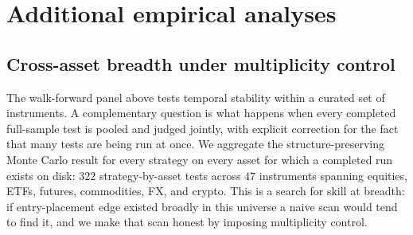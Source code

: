 \documentclass[preprint,12pt]{elsarticle}
\theoremstyle{definition}
\begin{document}
\section{Additional empirical analyses}
\label{supp:additional}

\subsection{Cross-asset breadth under multiplicity control}
\label{sec:supp-cross-asset}

The walk-forward panel above tests temporal stability within a curated set of instruments. A complementary question is what happens when every completed full-sample test is pooled and judged jointly, with explicit correction for the fact that many tests are being run at once. We aggregate the structure-preserving Monte Carlo result for every strategy on every asset for which a completed run exists on disk: $322$ strategy-by-asset tests across $47$ instruments spanning equities, ETFs, futures, commodities, FX, and crypto. This is a search for skill at breadth: if entry-placement edge existed broadly in this universe a naive scan would tend to find it, and we make that scan honest by imposing multiplicity control.
\end{document}

